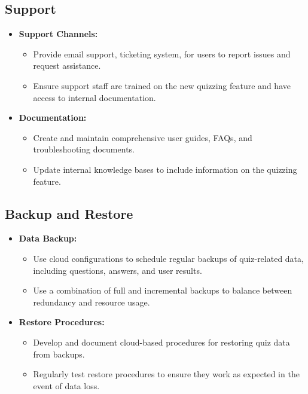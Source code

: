 \subsection{Support}

\begin{itemize}
    \item \textbf{Support Channels:}
          \begin{itemize}
              \item Provide email support, ticketing system, for users to report issues and request assistance.
              \item Ensure support staff are trained on the new quizzing feature and have access to internal documentation.
          \end{itemize}
    \item \textbf{Documentation:}
          \begin{itemize}
              \item Create and maintain comprehensive user guides, FAQs, and troubleshooting documents.
              \item Update internal knowledge bases to include information on the quizzing feature.
          \end{itemize}
\end{itemize}


\subsection{Backup and Restore}

\begin{itemize}
    \item \textbf{Data Backup:}
          \begin{itemize}
              \item Use cloud configurations to schedule regular backups of quiz-related data, including questions, answers, and user results.
              \item Use a combination of full and incremental backups to balance between redundancy and resource usage.
          \end{itemize}
    \item \textbf{Restore Procedures:}
          \begin{itemize}
              \item Develop and document cloud-based procedures for restoring quiz data from backups.
              \item Regularly test restore procedures to ensure they work as expected in the event of data loss.
          \end{itemize}
\end{itemize}


